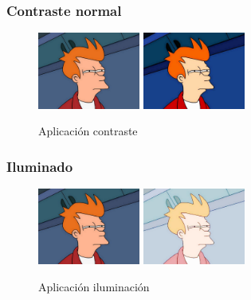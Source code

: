 \subsubsection{Contraste normal}
\vskip0.3cm
\begin{figure}[H]
 \centering
  \includegraphics[width=0.3\textwidth]{imagenes/Fry.jpg}
  \includegraphics[width=0.3\textwidth]{imagenes/fryContraste.jpg}
 \caption{Aplicación contraste}
 \label{diseño}
\end{figure}
\subsubsection{Iluminado}
\vskip0.3cm
\begin{figure}[H]
 \centering
  \includegraphics[width=0.3\textwidth]{imagenes/Fry.jpg}
  \includegraphics[width=0.3\textwidth]{imagenes/fryIluminado.jpg}
 \caption{Aplicación iluminación}
 \label{diseño}
\end{figure}
